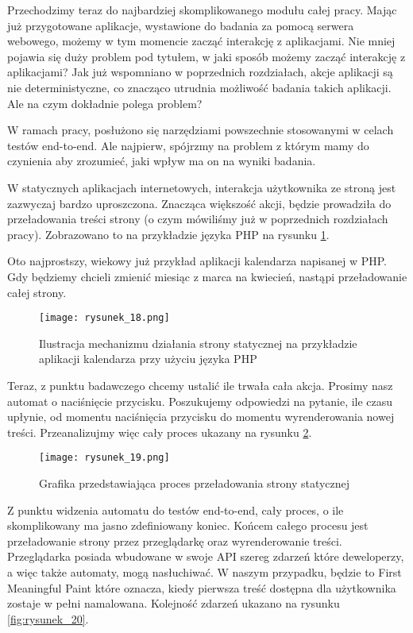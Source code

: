 Przechodzimy teraz do najbardziej skomplikowanego modułu całej pracy.
Mając już przygotowane aplikacje, wystawione do badania za pomocą serwera webowego, możemy w tym momencie zacząć interakcję z aplikacjami.
Nie mniej pojawia się duży problem pod tytułem, w jaki sposób możemy zacząć interakcję z aplikacjami?
Jak już wspomniano w poprzednich rozdziałach, akcje aplikacji są nie deterministyczne, co znacząco utrudnia możliwość badania takich aplikacji.
Ale na czym dokładnie polega problem?

W ramach pracy, posłużono się narzędziami powszechnie stosowanymi w celach testów end-to-end.
Ale najpierw, spójrzmy na problem z którym mamy do czynienia aby zrozumieć, jaki wpływ ma on na wyniki badania.

W statycznych aplikacjach internetowych, interakcja użytkownika ze stroną jest zazwyczaj bardzo uproszczona.
Znacząca większość akcji, będzie prowadziła do przeładowania treści strony (o czym mówiliśmy już w poprzednich rozdziałach pracy).
Zobrazowano to na przykładzie języka PHP na rysunku \ref{fig:rysunek_18}.

Oto najprostszy, wiekowy już przykład aplikacji kalendarza napisanej w PHP. Gdy będziemy chcieli zmienić miesiąc z marca na kwiecień, nastąpi przeładowanie całej strony.

\begin{figure}[!ht]
    \centering
    \texttt{[image: rysunek\_18.png]}
    \caption{Ilustracja mechanizmu działania strony statycznej na przykładzie aplikacji kalendarza przy użyciu języka PHP}
    \label{fig:rysunek_18}
\end{figure}

Teraz, z punktu badawczego chcemy ustalić ile trwała cała akcja. Prosimy nasz automat o naciśnięcie przycisku.
Poszukujemy odpowiedzi na pytanie, ile czasu upłynie, od momentu naciśnięcia przycisku do momentu wyrenderowania nowej treści. Przeanalizujmy więc cały proces ukazany na rysunku \ref{fig:rysunek_19}.

\begin{figure}[!ht]
    \centering
    \texttt{[image: rysunek\_19.png]}
    \caption{Grafika przedstawiająca proces przeładowania strony statycznej}
    \label{fig:rysunek_19}
\end{figure}

Z punktu widzenia automatu do testów end-to-end, cały proces, o ile skomplikowany ma jasno zdefiniowany koniec.
Końcem całego procesu jest przeładowanie strony przez przeglądarkę oraz wyrenderowanie treści.
Przeglądarka posiada wbudowane w swoje API szereg zdarzeń które deweloperzy, a więc także automaty, mogą nasłuchiwać.
W naszym przypadku, będzie to First Meaningful Paint \cite{rail-model} które oznacza, kiedy pierwsza treść dostępna dla użytkownika zostaje w pełni namalowana.
Kolejność zdarzeń ukazano na rysunku \ref{fig:rysunek_20}.

